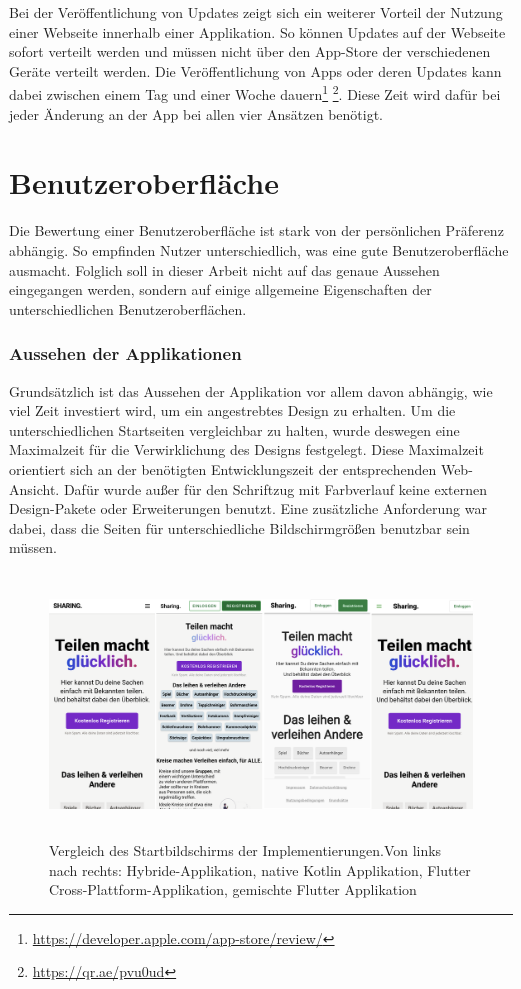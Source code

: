 Bei der Veröffentlichung von Updates zeigt sich ein weiterer Vorteil der Nutzung einer Webseite innerhalb einer Applikation. So können Updates auf der Webseite sofort verteilt werden und müssen nicht über den App-Store der verschiedenen Geräte verteilt werden. Die Veröffentlichung von Apps oder deren Updates kann dabei zwischen einem Tag und einer Woche dauern\footnote{\url{https://developer.apple.com/app-store/review/}} \footnote{\url{https://qr.ae/pvu0ud}}. Diese Zeit wird dafür bei jeder Änderung an der App bei allen vier Ansätzen benötigt.

\section{Benutzeroberfläche}
Die Bewertung einer Benutzeroberfläche ist stark von der persönlichen Präferenz abhängig. So empfinden Nutzer unterschiedlich, was eine gute Benutzeroberfläche ausmacht. Folglich soll in dieser Arbeit nicht auf das genaue Aussehen eingegangen werden, sondern auf einige allgemeine Eigenschaften der unterschiedlichen Benutzeroberflächen.

\subsubsection{Aussehen der Applikationen}
Grundsätzlich ist das Aussehen der Applikation vor allem davon abhängig, wie viel Zeit investiert wird, um ein angestrebtes Design zu erhalten. Um die unterschiedlichen Startseiten vergleichbar zu halten, wurde deswegen eine Maximalzeit für die Verwirklichung des Designs festgelegt. Diese Maximalzeit orientiert sich an der benötigten Entwicklungszeit der entsprechenden Web-Ansicht. Dafür wurde außer für den Schriftzug mit Farbverlauf keine externen Design-Pakete oder Erweiterungen benutzt. Eine zusätzliche Anforderung war dabei, dass die Seiten für unterschiedliche Bildschirmgrößen benutzbar sein müssen.

\begin{figure}[ht]
  \centering
  \includegraphics[height=7cm,keepaspectratio]{images/Startbildschirm_vergleich.png} 
  \caption[Vergleich des Startbildschirms der Implementierungen]{Vergleich des Startbildschirms der Implementierungen.\break Von links nach rechts: Hybride-Applikation, native Kotlin Applikation, Flutter Cross-Plattform-Applikation, gemischte Flutter Applikation}
  \label{fig:startscreen}
\end{figure}

